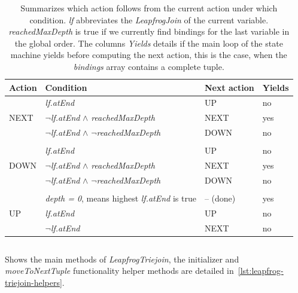 \begin{table}[]
    \centering
    \begin{tabular}{@{}llll@{}}
        \toprule
        Action                & Condition                                  & Next action & Yields \\ \midrule
        \multirow{3}{*}{NEXT} & \textit{lf.atEnd}                                   & UP          & no     \\
        & \textit{$\neg$lf.atEnd} $\wedge$ \textit{reachedMaxDepth}             & NEXT        & yes    \\
        & \textit{$\neg$lf.atEnd} $\wedge$ \textit{$\neg$reachedMaxDepth}            & DOWN        & no     \\
        & & &\\
        \multirow{3}{*}{DOWN} & \textit{lf.atEnd}                                   & UP          & no     \\
        & \textit{$\neg$lf.atEnd} $\wedge$ \textit{reachedMaxDepth}             & NEXT        & yes    \\
        & \textit{$\neg$lf.atEnd} $\wedge$ \textit{$\neg$reachedMaxDepth}            & DOWN        & no     \\
        & & &\\
        \multirow{3}{*}{UP}     & \textit{depth = 0}, means highest \textit{lf.atEnd} is true & -- (done)         & yes    \\
        & \textit{lf.atEnd}                                   & UP          & no     \\
        & \textit{$\neg$lf.atEnd}                                  & NEXT        & no     \\ \bottomrule
    \end{tabular}
    \caption{Summarizes which action follows from the current action under which condition. \textit{lf} abbreviates the
    \textit{LeapfrogJoin} of the current variable.
    \textit{reachedMaxDepth} is true if we currently find bindings for the
    last variable in the global order.
    The columns \textit{Yields} details if the main loop of the state machine yields before computing the next action,
    this is the case, when the \textit{bindings} array contains a complete tuple.
    }
    \label{table:lftj-state-machine}
\end{table}

\begin{listing}[H]
    \inputminted[mathescape, linenos=true]{scala}{code/LeapfrogTriejoinIdiomatic.scala}
    \caption{Shows the main methods of \textit{LeapfrogTriejoin}, the initializer and \textit{moveToNextTuple} functionality
    helper methods are detailed in~\cref{lst:leapfrog-triejoin-helpers}.}
    \label{lst:leapfrog-triejoin}
\end{listing}

